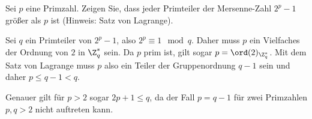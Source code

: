 
\begin{exercise}

Sei $p$ eine Primzahl. Zeigen Sie, dass jeder Primteiler der Mersenne-Zahl $2^p - 1$
größer als $p$ ist (Hinweis: Satz von Lagrange).

\end{exercise}


\begin{solution}

Sei $q$ ein Primteiler von $2^p - 1$, also $2^p \equiv 1 \mod{q}$.
Daher muss $p$ ein Vielfaches der Ordnung von $2$ in $\Z_q^*$ sein.
Da $p$ prim ist, gilt sogar $p = \ord(2)_{\Z_q^*}$.
Mit dem Satz von Lagrange muss $p$ also ein Teiler der Gruppenordnung $q-1$ sein
und daher $p \leq q - 1 < q$.

Genauer gilt für $p > 2$ sogar $2p + 1 \leq q$, da der Fall $p = q - 1$ für
zwei Primzahlen $p,q > 2$ nicht auftreten kann.
\end{solution}

